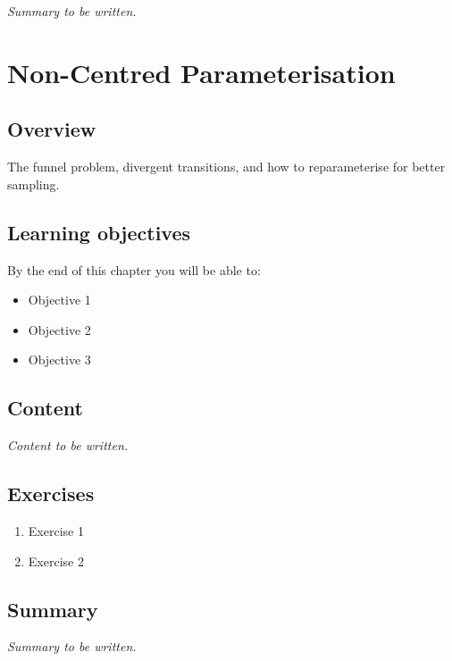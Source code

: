 \documentclass[
  11pt,
  a4paper,
  oneside,
  openany]{scrbook}
\providecommand{\tightlist}{%
  \setlength{\itemsep}{0pt}\setlength{\parskip}{0pt}}\usepackage{longtable,booktabs,array}
\begin{document}
\emph{Summary to be written.}

\chapter{Non-Centred
Parameterisation}\label{non-centred-parameterisation}

\section{Overview}\label{overview-9}

The funnel problem, divergent transitions, and how to reparameterise for
better sampling.

\section{Learning objectives}\label{learning-objectives-9}

By the end of this chapter you will be able to:

\begin{itemize}
\tightlist
\item[$\square$]
  Objective 1
\item[$\square$]
  Objective 2
\item[$\square$]
  Objective 3
\end{itemize}

\section{Content}\label{content-8}

\emph{Content to be written.}

\section{Exercises}\label{exercises-9}

\begin{enumerate}
\def\labelenumi{\arabic{enumi}.}
\tightlist
\item
  Exercise 1
\item
  Exercise 2
\end{enumerate}

\section{Summary}\label{summary-9}

\emph{Summary to be written.}
\end{document}
